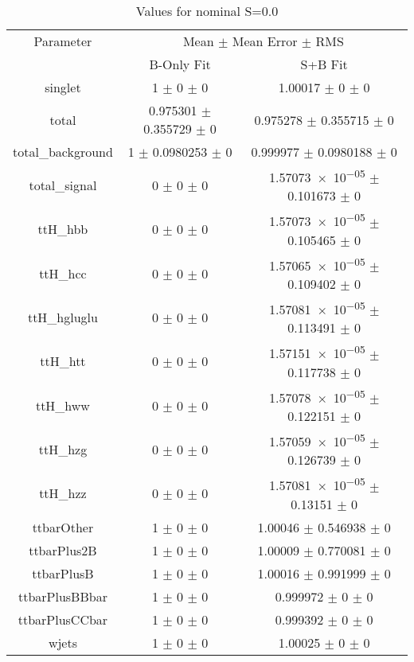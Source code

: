 \begin{table}
\centering
\caption{Values for nominal S=0.0}
\begin{tabular}{ccc}
\toprule
Parameter & \multicolumn{2}{c}{Mean $\pm$ Mean Error $\pm$ RMS}\\
 & B-Only Fit & S+B Fit\\
\midrule
singlet & \num{1} $\pm$ \num{0} $\pm$ \num{0} & \num{1.00017} $\pm$ \num{0} $\pm$ \num{0}\\
total & \num{0.975301} $\pm$ \num{0.355729} $\pm$ \num{0} & \num{0.975278} $\pm$ \num{0.355715} $\pm$ \num{0}\\
total\_background & \num{1} $\pm$ \num{0.0980253} $\pm$ \num{0} & \num{0.999977} $\pm$ \num{0.0980188} $\pm$ \num{0}\\
total\_signal & \num{0} $\pm$ \num{0} $\pm$ \num{0} & \num{1.57073e-05} $\pm$ \num{0.101673} $\pm$ \num{0}\\
ttH\_hbb & \num{0} $\pm$ \num{0} $\pm$ \num{0} & \num{1.57073e-05} $\pm$ \num{0.105465} $\pm$ \num{0}\\
ttH\_hcc & \num{0} $\pm$ \num{0} $\pm$ \num{0} & \num{1.57065e-05} $\pm$ \num{0.109402} $\pm$ \num{0}\\
ttH\_hgluglu & \num{0} $\pm$ \num{0} $\pm$ \num{0} & \num{1.57081e-05} $\pm$ \num{0.113491} $\pm$ \num{0}\\
ttH\_htt & \num{0} $\pm$ \num{0} $\pm$ \num{0} & \num{1.57151e-05} $\pm$ \num{0.117738} $\pm$ \num{0}\\
ttH\_hww & \num{0} $\pm$ \num{0} $\pm$ \num{0} & \num{1.57078e-05} $\pm$ \num{0.122151} $\pm$ \num{0}\\
ttH\_hzg & \num{0} $\pm$ \num{0} $\pm$ \num{0} & \num{1.57059e-05} $\pm$ \num{0.126739} $\pm$ \num{0}\\
ttH\_hzz & \num{0} $\pm$ \num{0} $\pm$ \num{0} & \num{1.57081e-05} $\pm$ \num{0.13151} $\pm$ \num{0}\\
ttbarOther & \num{1} $\pm$ \num{0} $\pm$ \num{0} & \num{1.00046} $\pm$ \num{0.546938} $\pm$ \num{0}\\
ttbarPlus2B & \num{1} $\pm$ \num{0} $\pm$ \num{0} & \num{1.00009} $\pm$ \num{0.770081} $\pm$ \num{0}\\
ttbarPlusB & \num{1} $\pm$ \num{0} $\pm$ \num{0} & \num{1.00016} $\pm$ \num{0.991999} $\pm$ \num{0}\\
ttbarPlusBBbar & \num{1} $\pm$ \num{0} $\pm$ \num{0} & \num{0.999972} $\pm$ \num{0} $\pm$ \num{0}\\
ttbarPlusCCbar & \num{1} $\pm$ \num{0} $\pm$ \num{0} & \num{0.999392} $\pm$ \num{0} $\pm$ \num{0}\\
wjets & \num{1} $\pm$ \num{0} $\pm$ \num{0} & \num{1.00025} $\pm$ \num{0} $\pm$ \num{0}\\
\bottomrule
\end{tabular}
\end{table}